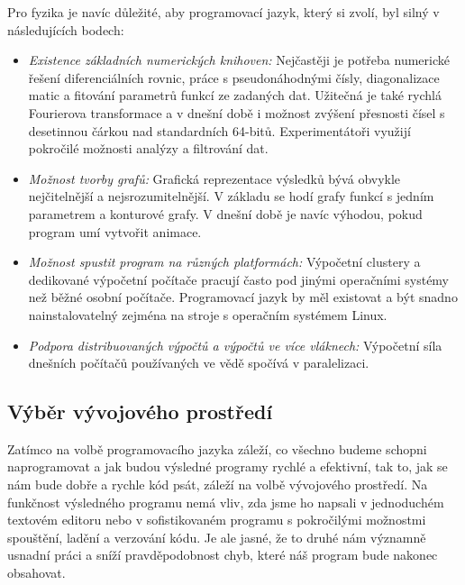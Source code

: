 \documentclass[a4paper,11pt,twoside]{article}
\theoremstyle{red}
\theoremstyle{green}
\begin{document}
        Pro fyzika je navíc důležité, aby programovací jazyk, který si zvolí, byl silný v následujících bodech:
        \begin{itemize}
            \item \emph{Existence základních numerických knihoven:} Nejčastěji je potřeba numerické řešení diferenciálních rovnic, práce s pseudonáhodnými čísly, diagonalizace matic a fitování parametrů funkcí ze zadaných dat.
            Užitečná je také rychlá Fourierova transformace a v dnešní době i možnost zvýšení přesnosti čísel s desetinnou čárkou nad standardních 64-bitů.
            Experimentátoři využijí pokročilé možnosti analýzy a filtrování dat.
            \item \emph{Možnost tvorby grafů:} Grafická reprezentace výsledků bývá obvykle nejčitelnější a nejsrozumitelnější. 
            V základu se hodí grafy funkcí s jedním parametrem a konturové grafy.
            V dnešní době je navíc výhodou, pokud program umí vytvořit animace.
            \item \emph{Možnost spustit program na různých platformách:} Výpočetní clustery a dedikované výpočetní počítače pracují často pod jinými operačními systémy než běžné osobní počítače.
            Programovací jazyk by měl existovat a být snadno nainstalovatelný zejména na stroje s operačním systémem Linux.
            \item \emph{Podpora distribuovaných výpočtů a výpočtů ve více vláknech:} Výpočetní síla dnešních počítačů používaných ve vědě spočívá v paralelizaci. 
        \end{itemize}

    \subsection{Výběr vývojového prostředí}
    \label{sec:IDE}
        Zatímco na volbě programovacího jazyka záleží, co všechno budeme schopni naprogramovat a jak budou výsledné programy rychlé a efektivní, tak to, jak se nám bude dobře a rychle kód psát, záleží na volbě vývojového prostředí.
        Na funkčnost výsledného programu nemá vliv, zda jsme ho napsali v jednoduchém textovém editoru nebo v sofistikovaném programu s pokročilými možnostmi spouštění, ladění a verzování kódu.
        Je ale jasné, že to druhé nám významně usnadní práci a sníží pravděpodobnost chyb, které náš program bude nakonec obsahovat.
\end{document}
